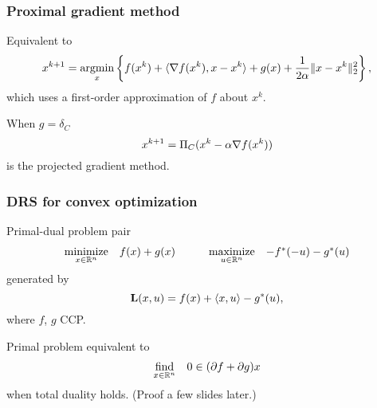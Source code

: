 \documentclass[10pt,mathserif]{beamer}
\begin{document}
\begin{frame}
\frametitle{Proximal gradient method}
Equivalent to
\[
x^{k+1}=
\operatorname*{argmin}_x
\left\{
f(x^k)+
\langle \nabla f(x^k),x-x^k\rangle
+g(x)
+\frac{1}{2\alpha}\|x-x^k\|_2^2
\right\},
\]
which uses a first-order approximation of $f$ about $x^k$.

\vspace{0.2in}

When $g=\delta_C$
\[
x^{k+1}=\Pi_C(x^k-\alpha \nabla f(x^k))
\]
is the projected gradient method.
\end{frame}






\begin{frame}
\frametitle{DRS for convex optimization}
Primal-dual problem pair
\begin{equation}
\begin{array}{ll}
\underset{x\in \mathbb{R}^n}{\mbox{minimize}}&f(x)+g(x)
\end{array}
\qquad
\begin{array}{ll}
\underset{u \in \mathbb{R}^n}{\mbox{maximize}}&-f^*(-u)-g^*(u)
\end{array}
\label{eq:drs-dual}
\end{equation}
generated by
\[
\mathbf{L}(x,u)=f(x)+\langle x,u\rangle-g^*(u),
\]
where $f$, $g$ CCP.

\vspace{0.2in}


Primal problem equivalent to
\[
\begin{array}{ll}
\underset{x\in \mathbb{R}^n}{\mbox{find}}&0\in (\partial f+\partial g)x
\end{array}
\]
when total duality holds. (Proof a few slides later.)
\end{frame}
\end{document}
